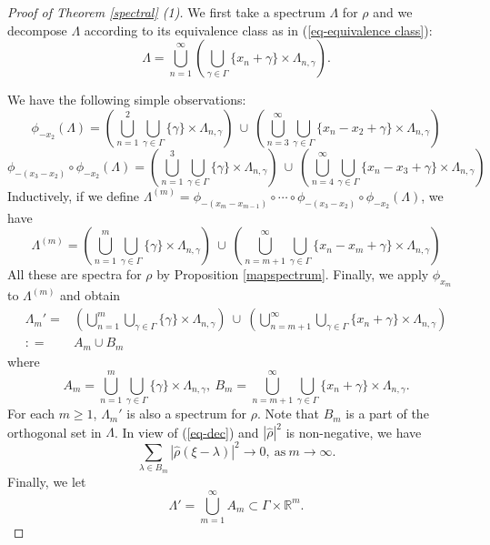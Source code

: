 \documentclass[reqno,a4paper,12pt]{amsart}
\numberwithin{equation}{section}
\newcommand{\R}{{\mathbb R}}
\newcounter{rem}
\theoremstyle{remark}
\numberwithin{equation}{section}
\def\R{\mathbb{R}}
\begin{document}
\begin{proof}[Proof of Theorem \ref{spectral} (1)]
We first take  a spectrum $\Lambda$ for $\rho$ and we decompose $\Lambda$ according to its equivalence class as in (\ref{eq-equivalence class}):
\begin{equation}\label{eq-dec}
\Lambda = \bigcup_{n=1}^{\infty} \left( \bigcup_{\gamma\in\Gamma} \{x_n+\gamma\}\times \Lambda_{n,\gamma}\right).
\end{equation}

We have the following simple observations:
$$
\phi_{-x_2}(\Lambda) =  \left(\bigcup_{n=1}^2\bigcup_{\gamma\in\Gamma} \{\gamma\}\times \Lambda_{n,\gamma} \right)~\cup~ \left(\bigcup_{n=3}^{\infty}\bigcup_{\gamma\in\Gamma} \{x_n-x_2+\gamma\}\times \Lambda_{n,\gamma}\right)
$$
$$
\phi_{-(x_3-x_2)}\circ\phi_{-x_2}(\Lambda)=\left( \bigcup_{n=1}^3\bigcup_{\gamma\in\Gamma} \{\gamma\}\times \Lambda_{n,\gamma}\right) ~\cup~\left( \bigcup_{n=4}^{\infty}\bigcup_{\gamma\in\Gamma} \{x_n-x_3+\gamma\}\times \Lambda_{n,\gamma}\right)
$$
Inductively, if we define $\Lambda^{(m)} = \phi_{-(x_{m}-x_{m-1})}\circ\cdots\circ\phi_{-(x_3-x_{2})}\circ\phi_{-x_2}(\Lambda)$, we have 
$$
\Lambda^{(m)}= \left(\bigcup_{n=1}^m\bigcup_{\gamma\in\Gamma} \{\gamma\}\times \Lambda_{n,\gamma}\right) ~\cup~ \left(\bigcup_{n=m+1}^{\infty}\bigcup_{\gamma\in\Gamma} \{x_n-x_m+\gamma\}\times \Lambda_{n,\gamma}\right)
$$
All these are spectra for $\rho$ by Proposition \ref{mapspectrum}. Finally, we apply $\phi_{x_m}$ to $\Lambda^{(m)}$ and obtain 
$$
\begin{aligned}
\Lambda_m' = &\left(\bigcup_{n=1}^m\bigcup_{\gamma\in\Gamma} \{\gamma\}\times \Lambda_{n,\gamma} \right)~\cup~ \left(\bigcup_{n=m+1}^{\infty}\bigcup_{\gamma\in\Gamma} \{x_n+\gamma\}\times \Lambda_{n,\gamma}\right)\\
: = & A_m\cup B_m
\end{aligned}
$$
 where
$$
A_m = \bigcup_{n=1}^m\bigcup_{\gamma\in\Gamma} \{\gamma\}\times \Lambda_{n,\gamma}, \ B_m = \bigcup_{n=m+1}^{\infty}\bigcup_{\gamma\in\Gamma} \{x_n+\gamma\}\times \Lambda_{n,\gamma}.
$$
For each $m\ge 1$, $\Lambda_m'$ is also a spectrum for $\rho$. Note that $B_m$ is a part of the orthogonal set  in $\Lambda$. In view of (\ref{eq-dec}) and $|\widehat{\rho}|^2$ is non-negative, we have 
\begin{equation}\label{eq-B_m-to 0}
\sum_{\lambda\in B_m} |\widehat{\rho}(\xi-\lambda)|^2 \to 0, \ \mbox{as} \ m\to\infty.
\end{equation}
Finally, we let 
$$
\Lambda' = \bigcup_{m=1}^{\infty} A_m \subset \Gamma\times \R^m.
$$
\end{proof}
\end{document}
